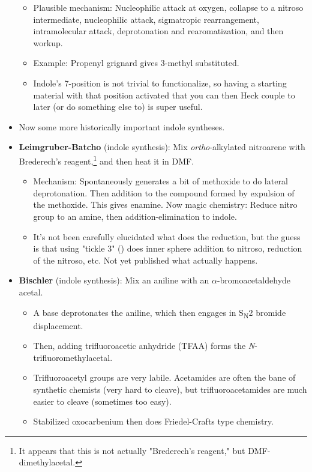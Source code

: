 \documentclass[../notes.tex]{subfiles}
\begin{document}
\begin{itemize}
\begin{itemize}
        \item Plausible mechanism: Nucleophilic attack at oxygen, collapse to a nitroso intermediate, nucleophilic attack, sigmatropic rearrangement, intramolecular attack, deprotonation and rearomatization, and then workup.
        \item Example: Propenyl grignard gives 3-methyl substituted.
        \item Indole's 7-position is not trivial to functionalize, so having a starting material with that position activated that you can then Heck couple to later (or do something else to) is super useful.
    \end{itemize}
    \item Now some more historically important indole syntheses.
    \item \textbf{Leimgruber-Batcho} (indole synthesis): Mix \emph{ortho}-alkylated nitroarene with Brederech's reagent,\footnote{It appears that this is not actually "Brederech's reagent," but DMF-dimethylacetal.} and then heat it in DMF.
    \begin{itemize}
        \item Mechanism: Spontaneously generates a bit of methoxide to do lateral deprotonation. Then addition to the compound formed by expulsion of the methoxide. This gives enamine. Now magic chemistry: Reduce nitro group to an amine, then addition-elimination to indole.
        \item It's not been carefully elucidated what does the reduction, but the guess is that using "tickle 3" () does inner sphere addition to nitroso, reduction of the nitroso, etc. Not yet published what actually happens.
    \end{itemize}
    \item \textbf{Bischler} (indole synthesis): Mix an aniline with an $\alpha$-bromoacetaldehyde acetal.
    \begin{itemize}
        \item A base deprotonates the aniline, which then engages in S\textsubscript{N}2 bromide displacement.
        \item Then, adding trifluoroacetic anhydride (TFAA) forms the \emph{N}-trifluoromethylacetal.
        \item Trifluoroacetyl groups are very labile. Acetamides are often the bane of synthetic chemists (very hard to cleave), but trifluoroacetamides are much easier to cleave (sometimes too easy).
        \item Stabilized oxocarbenium then does Friedel-Crafts type chemistry.

\end{itemize}
\end{itemize}
\end{document}
